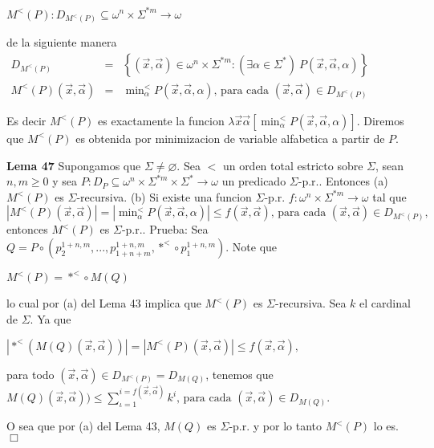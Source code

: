 \(\displaystyle M^{< }(P):D_{M^{< }(P)}\subseteq \omega ^{n}\times \Sigma ^{\ast m}\rightarrow \omega \)

de la siguiente manera
\(\displaystyle \begin{array}{rcl} D_{M^{< }(P)} & =& \left\{ (\vec{x},\vec{\alpha})\in \omega ^{n}\times \Sigma ^{\ast m}:(\exists \alpha \in \Sigma ^{\ast })\ P(\vec{x},\vec{\alpha} ,\alpha )\right\} \\ M^{< }(P)(\vec{x},\vec{\alpha}) & =& \min\nolimits_{\alpha }^{< }P(\vec{x},\vec{ \alpha},\alpha )\text{, para cada }(\vec{x},\vec{\alpha})\in D_{M^{< }(P)} \end{array} \)

Es decir \(M^{< }(P)\) es exactamente la funcion \(\lambda \vec{x}\vec{\alpha} \left[ \min_{\alpha }^{< }P(\vec{x},\vec{\alpha},\alpha )\right] \). Diremos que \(M^{< }(P)\) es obtenida por minimizacion de variable alfabetica a partir de \(P\).



\textbf{Lema 47} Supongamos que \(\Sigma \neq \varnothing \). Sea \(< \) un orden total estricto sobre \(\Sigma \), sean \(n,m\geq 0\) y sea \( P:D_{P}\subseteq \omega ^{n}\times \Sigma ^{\ast m}\times \Sigma ^{\ast }\rightarrow \omega \) un predicado \(\Sigma \)-p.r.. Entonces
(a) \(M^{< }(P)\) es \(\Sigma \)-recursiva.
(b) Si existe una funcion \(\Sigma \)-p.r. \(f:\omega ^{n}\times \Sigma ^{\ast m}\rightarrow \omega \) tal que
\(\displaystyle \left\vert M^{< }(P)(\vec{x},\vec{\alpha})\right\vert =\left\vert \min\nolimits_{\alpha }^{< }P(\vec{x},\vec{\alpha},\alpha )\right\vert \leq f( \vec{x},\vec{\alpha})\text{, para cada }(\vec{x},\vec{\alpha})\in D_{M^{< }(P)}\text{,} \)
entonces \(M^{< }(P)\) es \(\Sigma \)-p.r..
Prueba: Sea \(Q=P\circ \left( p_{2}^{1+n,m},...,p_{1+n+m}^{1+n,m},\ast ^{< }\circ p_{1}^{1+n,m}\right) \). Note que

\(\displaystyle M^{< }(P)=\ast ^{< }\circ M(Q) \)

lo cual por (a) del Lema 43 implica que \(M^{< }(P)\) es \( \Sigma \)-recursiva.
Sea \(k\) el cardinal de \(\Sigma \). Ya que

\(\displaystyle \left\vert \ast ^{< }(M(Q)(\vec{x},\vec{\alpha}))\right\vert =\left\vert M^{< }(P)(\vec{x},\vec{\alpha})\right\vert \leq f(\vec{x},\vec{\alpha})\text{, } \)

para todo \((\vec{x},\vec{\alpha})\in D_{M^{< }(P)}=D_{M(Q)}\), tenemos que
\(\displaystyle M(Q)(\vec{x},\vec{\alpha}))\leq \sum_{\iota =1}^{i=f(\vec{x},\vec{\alpha} )}k^{i}\text{, para cada }(\vec{x},\vec{\alpha})\in D_{M(Q)}\text{.} \)

O sea que por (a) del Lema 43, \(M(Q)\) es \(\Sigma \)-p.r. y por lo tanto \(M^{< }(P)\) lo es. \(\Box\)
